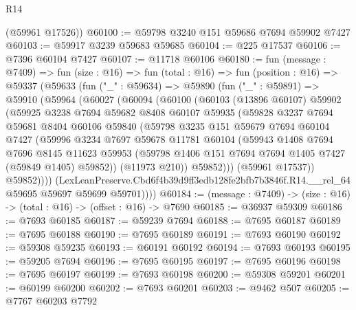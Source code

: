 \begin{lexlean}{R14}
\begin{coremodule}
      (@59961 @17526))
@60100 := @59798 @3240 @151 @59686 @7694 @59902 @7427
@60103 := @59917 @3239 @59683 @59685
@60104 := @225 @17537
@60106 := @7396 @60104 @7427
@60107 := @11718 @60106
@60180 := fun (message : @7409) =>
  fun (size : @16) =>
  fun (total : @16) =>
  fun (position : @16) =>
  @59337
    (@59633
      (fun ("_" : @59634) =>
      @59890
        (fun ("_" : @59891) =>
        @59910
          (@59964
            (@60027
              (@60094
                (@60100
                  (@60103
                    (@13896 @60107)
                    @59902
                    (@59925
                      @3238
                      @7694
                      @59682
                      @8408
                      @60107
                      @59935
                      (@59828
                        @3237
                        @7694
                        @59681
                        @8404
                        @60106
                        @59840
                        (@59798
                          @3235
                          @151
                          @59679
                          @7694
                          @60104
                          @7427
                          (@59996
                            @3234
                            @7697
                            @59678
                            @11781
                            @60104
                            (@59943
                              @1408
                              @7694
                              @7696
                              @8145
                              @11623
                              @59953
                              (@59798 @1406 @151 @7694 @7694 @1405 @7427 (@59849 @1405) @59852))
                            (@11973 @210))
                          @59852)))
                    (@59961 @17537))
                  @59852))))
          (LexLeanPreserve.Cbd6f4b39d9ff3edb128fe2bfb7b3846f.R14.__rel_64
            @59695
            @59697
            @59699
            @59701))))
@60184 := (message : @7409) -> (size : @16) -> (total : @16) -> (offset : @16) -> @7690
@60185 := @36937 @59309
@60186 := @7693 @60185
@60187 := @59239 @7694
@60188 := @7695 @60187
@60189 := @7695 @60188
@60190 := @7695 @60189
@60191 := @7693 @60190
@60192 := @59308 @59235
@60193 := @60191 @60192
@60194 := @7693 @60193
@60195 := @59205 @7694
@60196 := @7695 @60195
@60197 := @7695 @60196
@60198 := @7695 @60197
@60199 := @7693 @60198
@60200 := @59308 @59201
@60201 := @60199 @60200
@60202 := @7693 @60201
@60203 := @9462 @507
@60205 := @7767 @60203 @7792

\end{coremodule}
\end{lexlean}
